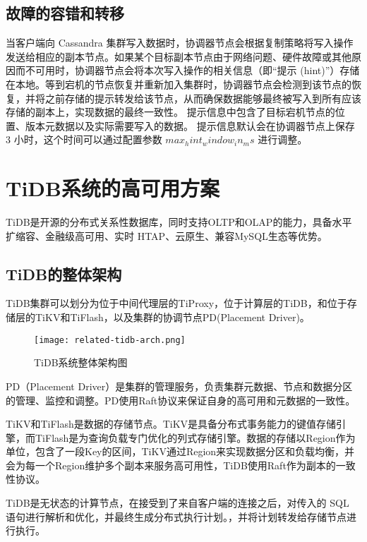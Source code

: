 \subsection{故障的容错和转移}

当客户端向 Cassandra 集群写入数据时，协调器节点会根据复制策略将写入操作发送给相应的副本节点。如果某个目标副本节点由于网络问题、硬件故障或其他原因而不可用时，协调器节点会将本次写入操作的相关信息（即“提示 (hint)”）存储在本地。等到宕机的节点恢复并重新加入集群时，协调器节点会检测到该节点的恢复，并将之前存储的提示转发给该节点，从而确保数据能够最终被写入到所有应该存储的副本上，实现数据的最终一致性。
提示信息中包含了目标宕机节点的位置、版本元数据以及实际需要写入的数据。
提示信息默认会在协调器节点上保存 3 小时，这个时间可以通过配置参数 $max_hint_window_in_ms$ 进行调整。


\section{TiDB系统的高可用方案}
TiDB\cite{huang2020tidb}是开源的分布式关系性数据库，同时支持OLTP和OLAP的能力，具备水平扩缩容、金融级高可用、实时 HTAP、云原生、兼容MySQL生态等优势。

\subsection{TiDB的整体架构}

TiDB集群可以划分为位于中间代理层的TiProxy，位于计算层的TiDB，和位于存储层的TiKV和TiFlash，以及集群的协调节点PD(Placement Driver)。

\begin{figure}
  \centering
  \texttt{[image: related-tidb-arch.png]}
  \caption{TiDB系统整体架构图}
  \label{fig:tidb-arch}
\end{figure}

PD（Placement Driver）是集群的管理服务，负责集群元数据、节点和数据分区的管理、监控和调整。PD使用Raft协议来保证自身的高可用和元数据的一致性。

TiKV和TiFlash是数据的存储节点。TiKV是具备分布式事务能力的键值存储引擎，而TiFlash是为查询负载专门优化的列式存储引擎。数据的存储以Region作为单位，包含了一段Key的区间，TiKV通过Region来实现数据分区和负载均衡，并会为每一个Region维护多个副本来服务高可用性，TiDB使用Raft作为副本的一致性协议。

TiDB是无状态的计算节点，在接受到了来自客户端的连接之后，对传入的 SQL 语句进行解析和优化，并最终生成分布式执行计划。，并将计划转发给存储节点进行执行。

